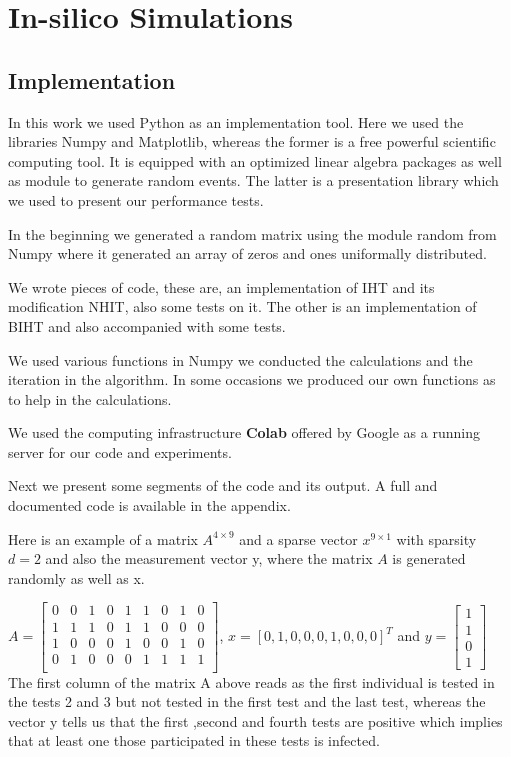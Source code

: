 \chapter{In-silico Simulations}

\section{Implementation} 

In this work we used Python as an implementation tool. Here we used the libraries Numpy and Matplotlib, whereas the former is a free powerful scientific computing tool. It is equipped with an optimized linear algebra packages as well as module to generate random events. The latter is a presentation library which we used to present our performance tests. 

In the beginning we generated a random matrix using the module random from Numpy where it generated an array of zeros and ones uniformally distributed. 

We wrote pieces of code, these are, an implementation of IHT and its modification NHIT, also some tests on it. The other is an implementation of BIHT and also accompanied with some tests. 


We used various functions in Numpy we conducted the calculations and the iteration in the algorithm. In some occasions we produced our own functions as to help in the calculations.   


We used the computing infrastructure \textbf{Colab} offered by Google as a running server for our code and experiments. 

Next we present some segments of the code and its output. A full and documented code is available in the appendix.   

Here is an example of a matrix $A^{4\times 9}$ and a sparse vector $x^{9\times1}$ with sparsity $d = 2$ and also the measurement vector y, where the matrix $ A $ is generated randomly as well as x.  


\vspace{5mm}

$ A =  \begin{bmatrix}
0 & 0 & 1 & 0 & 1 & 1 & 0 & 1 &0 \\
1 & 1 & 1 & 0 & 1 & 1 & 0 & 0 &0 \\
1 & 0 & 0 & 0 & 1 & 0 & 0 & 1 &0 \\
0 & 1 & 0 & 0 & 0 & 1 & 1 & 1 &1 \\
\end{bmatrix}$,  \quad  $ x = [0, 1, 0, 0, 0, 1, 0, 0, 0]^{T} $  and $y = \begin{bmatrix}
1\\
1\\
0\\
1
\end{bmatrix}$
\vspace{5mm}
The first column of the matrix A above reads as the first individual is tested in the tests 2 and 3 but not tested in the first test and the last test, whereas the vector y tells us that the first ,second and fourth tests are positive which implies that at least one those participated in these tests is infected. 



